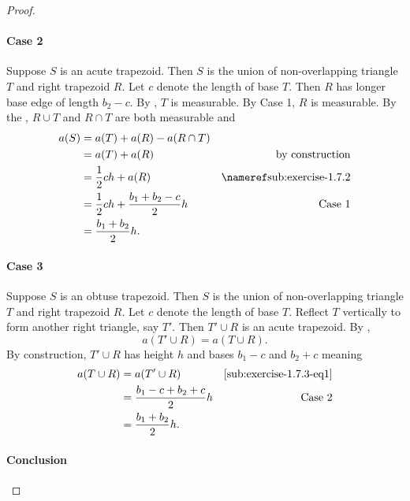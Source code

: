\documentclass{report}
\begin{document}
\begin{proof}
  \paragraph{Case 2}%

    Suppose $S$ is an acute trapezoid.
    Then $S$ is the union of non-overlapping triangle $T$ and right trapezoid $R$.
    Let $c$ denote the length of base $T$.
    Then $R$ has longer base edge of length $b_2 - c$.
    By , $T$ is measurable.
    By Case 1, $R$ is measurable.
    By the , $R \cup T$ and $R \cap T$ are
      both measurable and
      \begin{align*}
        a(S)
          & = a(T) + a(R) - a(R \cap T) \\
          & = a(T) + a(R) & \text{by construction} \\
          & = \frac{1}{2}ch + a(R) & \textref{sub:exercise-1.7.2} \\
          & = \frac{1}{2}ch + \frac{b_1 + b_2 - c}{2}h & \text{Case 1} \\
          & = \frac{b_1 + b_2}{2}h.
      \end{align*}

  \paragraph{Case 3}%

    Suppose $S$ is an obtuse trapezoid.
    Then $S$ is the union of non-overlapping triangle $T$ and right trapezoid $R$.
    Let $c$ denote the length of base $T$.
    Reflect $T$ vertically to form another right triangle, say $T'$.
    Then $T' \cup R$ is an acute trapezoid.
    By ,
      \begin{equation}
        \label{sub:exercise-1.7.3-eq1}
        \tag{3.1}
        a(T' \cup R) = a(T \cup R).
      \end{equation}
    By construction, $T' \cup R$ has height $h$ and bases $b_1 - c$ and $b_2 + c$
      meaning
      \begin{align*}
        a(T \cup R)
          & = a(T' \cup R) & \eqref{sub:exercise-1.7.3-eq1} \\
          & = \frac{b_1 - c + b_2 + c}{2}h & \text{Case 2} \\
          & = \frac{b_1 + b_2}{2}h.
      \end{align*}

  \paragraph{Conclusion}%


\end{proof}
\end{document}
